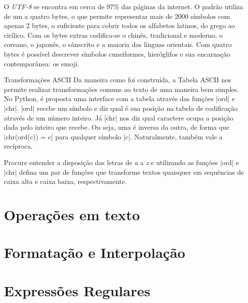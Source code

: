     O \emph{UTF-8} se encontra em cerca de 97\% das páginas da internet\cite{w3techs:2021}. O padrão utiliza de um a quatro bytes, o que permite representar mais de 2000 símbolos com apenas 2 bytes, o suficiente para cobrir todos os alfabetos latinos, do grego ao cirílico. Com os bytes extras codifica-se o chinês, tradicional e moderno, o coreano, o japonês, o sânscrito e a maioria das línguas orientais. Com quatro bytes é possível descrever símbolos cuneiformes, hieróglifos e sua encarnação contemporânea: os emoji.\par

    \begin{problem}{Transformações ASCII}%
    Da maneira como foi construída, a Tabela ASCII nos permite realizar transformações comuns ao texto de uma maneira bem simples. No Python, é proposta uma interface com a tabela através das funções |ord| e |chr|. |ord| recebe um símbolo e diz qual é sua posição na tabela de codificação através de um número inteiro. Já |chr| nos diz qual caractere ocupa a posição dada pelo inteiro que recebe. Ou seja, uma é inversa da outra, de forma que |chr(ord(c)) = c| para qualquer símbolo |c|. Naturalmente, também vale a recíproca.\par

    \proposal Procure entender a disposição das letras de \emph{a} a \emph{z} e utilizando as funções |ord| e |chr| defina um par de funções que transforme textos quaisquer em sequências de caixa alta e caixa baixa, respectivamente.

    \end{problem}

    \section*{Operações em texto}

    \section*{Formatação e Interpolação}

    \section*{Expressões Regulares}